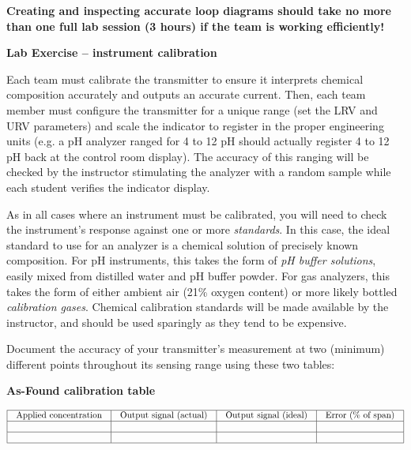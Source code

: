 \vskip 10pt

{\bf Creating and inspecting accurate loop diagrams should take no more than one full lab session (3 hours) if the team is working efficiently!}





\vfil \eject

\noindent
{\bf Lab Exercise -- instrument calibration}

\vskip 5pt

Each team must calibrate the transmitter to ensure it interprets chemical composition accurately and outputs an accurate current.  Then, each team member must configure the transmitter for a unique range (set the LRV and URV parameters) and scale the indicator to register in the proper engineering units (e.g. a pH analyzer ranged for 4 to 12 pH should actually register 4 to 12 pH back at the control room display).  The accuracy of this ranging will be checked by the instructor stimulating the analyzer with a random sample while each student verifies the indicator display.

As in all cases where an instrument must be calibrated, you will need to check the instrument's response against one or more {\it standards}.  In this case, the ideal standard to use for an analyzer is a chemical solution of precisely known composition.  For pH instruments, this takes the form of {\it pH buffer solutions}, easily mixed from distilled water and pH buffer powder.  For gas analyzers, this takes the form of either ambient air (21\% oxygen content) or more likely bottled {\it calibration gases}.  Chemical calibration standards will be made available by the instructor, and should be used sparingly as they tend to be expensive.

\filbreak

Document the accuracy of your transmitter's measurement at two (minimum) different points throughout its sensing range using these two tables:

\vskip 10pt

{\bf As-Found calibration table}


$$\vbox{\offinterlineskip
\halign{\strut
\vrule \quad\hfil # \ \hfil & 
\vrule \quad\hfil # \ \hfil & 
\vrule \quad\hfil # \ \hfil & 
\vrule \quad\hfil # \ \hfil \vrule \cr
\noalign{\hrule}
%
Applied concentration & Output signal (actual) & Output signal (ideal) & Error (\% of span) \cr
%
\noalign{\hrule}
%
 &  &  & \cr
%
\noalign{\hrule}
%
 &  &  & \cr
%
\noalign{\hrule}
} %
}$$ %

